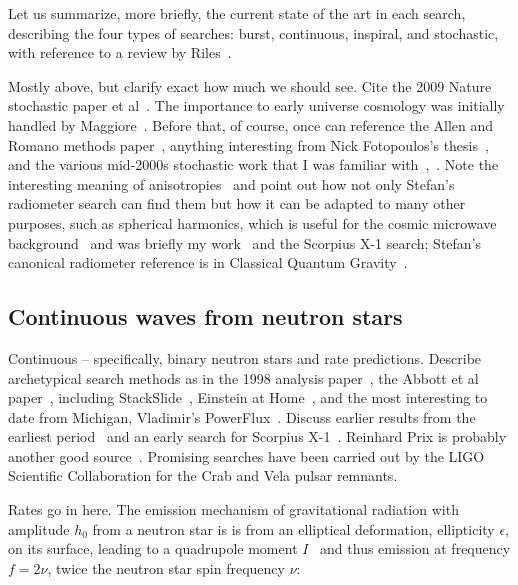 
            Let us summarize, more briefly, the current state of the art in each search, describing the four types of searches: burst, continuous, inspiral, and stochastic, with reference to a review by Riles~\cite{Riles2013}.

		Mostly above, but clarify exact how much we should see. Cite the 2009 Nature stochastic paper et al~\cite{LIGOStochasticNature2009}. The importance to early universe cosmology was initially handled by Maggiore~\cite{Maggiore2000}. Before that, of course, once can reference the Allen and Romano methods paper~\cite{Allen1999}, anything interesting from Nick Fotopoulos's thesis~\cite{FotopoulosThesis}, and the various mid-2000s stochastic work that I was familiar with~\cite{Abbott2006},~\cite{Abbott2007}. Note the interesting meaning of anisotropies~\cite{Allen1997} and point out how not only Stefan's radiometer search can find them but how it can be adapted to many other purposes, such as spherical harmonics, which is useful for the cosmic microwave background~\cite{Muciaccia1997} and was briefly my work~\cite{MeadorsCaltech2007} and the Scorpius X-1 search; Stefan's canonical radiometer reference is in Classical Quantum Gravity~\cite{Radiometer2006}.

        \subsection{Continuous waves from neutron stars}
        \label{continuous_waves}

            Continuous -- specifically, binary neutron stars and rate predictions. Describe archetypical search methods as in the 1998 analysis paper~\cite{Jaranowski1998}, the Abbott et al paper~\cite{LSCPulsar2006}, including StackSlide~\cite{LSCPulsarS4}, Einstein at Home~\cite{LSCEinsteinHome2009}, and the most interesting to date from Michigan, Vladimir's PowerFlux~\cite{LSCPowerFlux2009}. Discuss earlier results from the earliest period~\cite{Abbott2004} and an early search for Scorpius X-1~\cite{AbbottPulsar2006}. Reinhard Prix is probably another good source~\cite{Prix2006}.
Promising searches have been carried out by the LIGO Scientific Collaboration for the Crab and Vela pulsar remnants.

		Rates go in here.
        The emission mechanism of gravitational radiation with amplitude $h_0$ from a neutron star is is from an elliptical deformation, ellipticity $\epsilon$, on its surface, leading to a quadrupole moment $I$~\cite{Zimmermann1979,LSCPulsar2006} and thus emission at frequency $f = 2\nu$, twice the neutron star spin frequency $\nu$:

